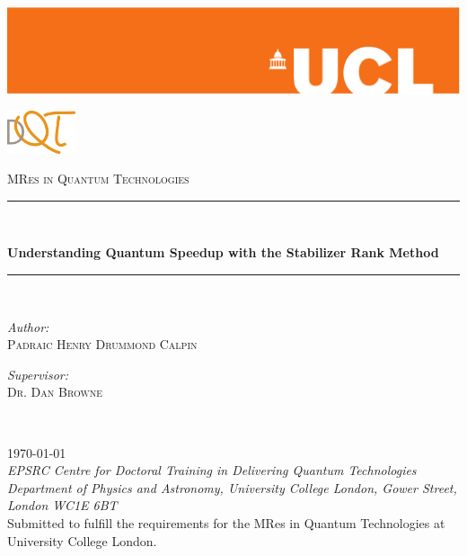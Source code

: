 \newcommand{\HRule}{\rule{\linewidth}{0.5mm}}
\begin{titlepage}
\hspace*{-2.5cm}\includegraphics[width=1.2\hsize]{Figures/orange-eps-converted-to}
\\[3cm]
\begin{flushright}
	\includegraphics[width=0.15\textwidth]{Figures/DQT-LOGO.png}
\end{flushright}
\vspace{-15pt}
\textsc{\large MRes in Quantum Technologies}
\\[1cm]
\HRule \\[0.5cm]
\begin{center}
	\textsf{\huge \bfseries Understanding Quantum Speedup with the Stabilizer Rank Method} \\
\end{center}
\HRule \\[1cm]
\begin{minipage}{0.5\textwidth}
	\begin{flushleft}
		\emph{Author:} \\
		\textsc{Padraic Henry Drummond Calpin} \\[0.4cm]	
	\end{flushleft}
\end{minipage}
\begin{minipage}{0.5\textwidth}
	\begin{flushright}
		\emph{Supervisor:} \\
		\textsc{Dr. Dan Browne} \\[0.4cm]
	\end{flushright}
\end{minipage} \\[1cm]
\begin{center}
	\large \today\\[0.5cm]
	\emph{EPSRC Centre for Doctoral Training in Delivering Quantum Technologies\\ Department of Physics and Astronomy, University College London, Gower Street, London WC1E 6BT}
	\\[2.5cm]
	Submitted to fulfill the requirements for the MRes in Quantum Technologies at University College London.
\end{center}
\end{titlepage}